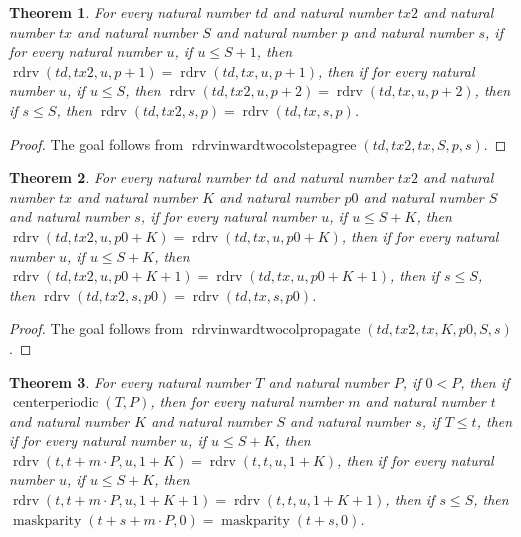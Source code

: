 \documentclass[11pt]{article}
\newtheorem{theorem}{Theorem}[section]
\theoremstyle{definition}
\begin{document}
\begin{theorem}
\label{ll:paper:rdrv-inward-two-col-step-agree}
For every natural number \(td\) and natural number \(tx2\) and natural number \(tx\) and natural number \(S\) and natural number \(p\) and natural number \(s\), if for every natural number \(u\), if \(u \le S + 1\), then \(\operatorname{rdrv}(td, tx2, u, p + 1) = \operatorname{rdrv}(td, tx, u, p + 1)\), then if for every natural number \(u\), if \(u \le S\), then \(\operatorname{rdrv}(td, tx2, u, p + 2) = \operatorname{rdrv}(td, tx, u, p + 2)\), then if \(s \le S\), then \(\operatorname{rdrv}(td, tx2, s, p) = \operatorname{rdrv}(td, tx, s, p)\).
\end{theorem}
\begin{proof}
The goal follows from \(\operatorname{rdrvinwardtwocolstepagree}(td, tx2, tx, S, p, s)\).
\end{proof}
\begin{theorem}
\label{ll:paper:rdrv-inward-two-col-propagate}
For every natural number \(td\) and natural number \(tx2\) and natural number \(tx\) and natural number \(K\) and natural number \(p0\) and natural number \(S\) and natural number \(s\), if for every natural number \(u\), if \(u \le S + K\), then \(\operatorname{rdrv}(td, tx2, u, p0 + K) = \operatorname{rdrv}(td, tx, u, p0 + K)\), then if for every natural number \(u\), if \(u \le S + K\), then \(\operatorname{rdrv}(td, tx2, u, p0 + K + 1) = \operatorname{rdrv}(td, tx, u, p0 + K + 1)\), then if \(s \le S\), then \(\operatorname{rdrv}(td, tx2, s, p0) = \operatorname{rdrv}(td, tx, s, p0)\).
\end{theorem}
\begin{proof}
The goal follows from \(\operatorname{rdrvinwardtwocolpropagate}(td, tx2, tx, K, p0, S, s)\).
\end{proof}
\begin{theorem}
\label{ll:paper:periodic-maskparity-zero-agree-of-rdrv-two-col-agree}
For every natural number \(T\) and natural number \(P\), if \(0 < P\), then if \(\operatorname{centerperiodic}(T, P)\), then for every natural number \(m\) and natural number \(t\) and natural number \(K\) and natural number \(S\) and natural number \(s\), if \(T \le t\), then if for every natural number \(u\), if \(u \le S + K\), then \(\operatorname{rdrv}(t, t + m \cdot P, u, 1 + K) = \operatorname{rdrv}(t, t, u, 1 + K)\), then if for every natural number \(u\), if \(u \le S + K\), then \(\operatorname{rdrv}(t, t + m \cdot P, u, 1 + K + 1) = \operatorname{rdrv}(t, t, u, 1 + K + 1)\), then if \(s \le S\), then \(\operatorname{maskparity}(t + s + m \cdot P, 0) = \operatorname{maskparity}(t + s, 0)\).
\end{theorem}
\end{document}

